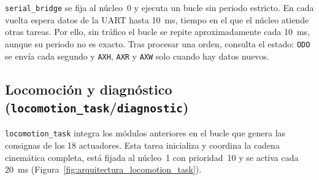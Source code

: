 \texttt{serial\_bridge} se fija al núcleo~0 y ejecuta un bucle sin periodo
estricto. En cada vuelta espera datos de la UART hasta 10~ms,
tiempo en el que el núcleo atiende otras tareas. Por ello, sin
tráfico el bucle se repite aproximadamente cada 10~ms, aunque su periodo no es
exacto. Tras procesar una orden, consulta el estado: \texttt{ODO} se envía cada
segundo y \texttt{AXH}, \texttt{AXR} y \texttt{AXW} solo cuando hay datos nuevos.

\newpage
\subsection{Locomoción y diagnóstico
(\texttt{locomotion\_task}/\texttt{diagnostic})}
\label{subsec:locomotion_task}
\label{subsec:diagnostic}

\texttt{locomotion\_task} integra los módulos anteriores en el bucle que genera
las consignas de los 18 actuadores. Esta tarea inicializa y coordina la cadena
cinemática completa, está fijada al núcleo~1 con prioridad~10 y se activa cada
20~ms
(Figura~\ref{fig:arquitectura_locomotion_task}).

